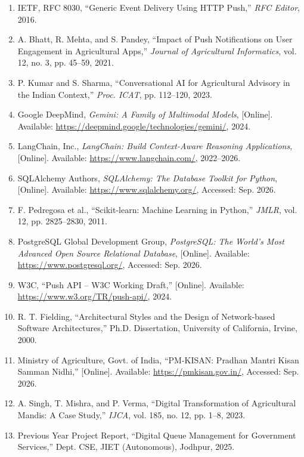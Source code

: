\begin{enumerate}
\item IETF, RFC 8030, ``Generic Event Delivery Using HTTP Push,'' \textit{RFC Editor}, 2016.

\item A. Bhatt, R. Mehta, and S. Pandey, ``Impact of Push Notifications on User Engagement in Agricultural Apps,'' \textit{Journal of Agricultural Informatics}, vol. 12, no. 3, pp. 45--59, 2021.

\item P. Kumar and S. Sharma, ``Conversational AI for Agricultural Advisory in the Indian Context,'' \textit{Proc. ICAT}, pp. 112--120, 2023.

\item Google DeepMind, \textit{Gemini: A Family of Multimodal Models}, [Online]. Available: \url{https://deepmind.google/technologies/gemini/}, 2024.

\item LangChain, Inc., \textit{LangChain: Build Context-Aware Reasoning Applications}, [Online]. Available: \url{https://www.langchain.com/}, 2022--2026.

\item SQLAlchemy Authors, \textit{SQLAlchemy: The Database Toolkit for Python}, [Online]. Available: \url{https://www.sqlalchemy.org/}, Accessed: Sep. 2026.

\item F. Pedregosa et al., ``Scikit-learn: Machine Learning in Python,'' \textit{JMLR}, vol. 12, pp. 2825--2830, 2011.

\item PostgreSQL Global Development Group, \textit{PostgreSQL: The World's Most Advanced Open Source Relational Database}, [Online]. Available: \url{https://www.postgresql.org/}, Accessed: Sep. 2026.

\item W3C, ``Push API -- W3C Working Draft,'' [Online]. Available: \url{https://www.w3.org/TR/push-api/}, 2024.

\item R. T. Fielding, ``Architectural Styles and the Design of Network-based Software Architectures,'' Ph.D. Dissertation, University of California, Irvine, 2000.

\item Ministry of Agriculture, Govt. of India, ``PM-KISAN: Pradhan Mantri Kisan Samman Nidhi,'' [Online]. Available: \url{https://pmkisan.gov.in/}, Accessed: Sep. 2026.

\item A. Singh, T. Mishra, and P. Verma, ``Digital Transformation of Agricultural Mandis: A Case Study,'' \textit{IJCA}, vol. 185, no. 12, pp. 1--8, 2023.

\item Previous Year Project Report, ``Digital Queue Management for Government Services,'' Dept. CSE, JIET (Autonomous), Jodhpur, 2025.

\end{enumerate}
